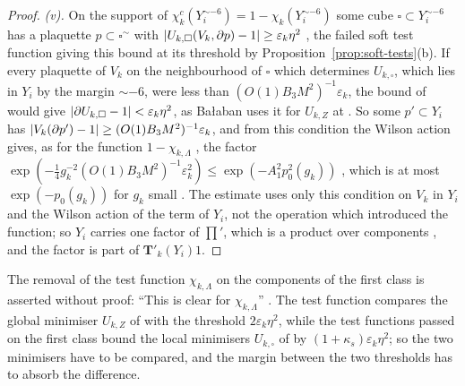\documentclass[11pt]{preprint}
\DeclarePairedDelimiter{\abs}{\lvert}{\rvert}
\numberwithin{equation}{section}
\theoremstyle{definition}
\theoremstyle{remark}
\theoremstyle{plain}
\begin{document}
\begin{proof}
\emph{(v).} On the support of $\chi^c_k(Y_i^{\sim-6}) = 1 - \chi_k(Y_i^{\sim-6})$ \cite[p.~378, l.~6, l.~21]{BalabanLFR2} some cube $\square \subset Y_i^{\sim-6}$ has a plaquette $p \subset \square^\sim$ with $\abs{U_{k,\square}(V_k, \partial p) - 1} \geq \varepsilon_k\eta^2$ \cite[(2.17), p.~257]{BalabanCRE}, the failed soft test function giving this bound at its threshold by Proposition~\ref{prop:soft-tests}(b). If every plaquette of $V_k$ on the neighbourhood of $\square$ which determines $U_{k,\square}$, which lies in $Y_i$ by the margin $\sim-6$, were less than $(O(1)B_3M^2)^{-1}\varepsilon_k$, the bound of \cite[Theorem~1, p.~279]{BalabanVAR} would give $\abs{\partial U_{k,\square} - 1} < \varepsilon_k\eta^2$, as Ba{\l}aban uses it for $U_{k,Z}$ at \cite[p.~193, l.~20, ll.~28--29]{BalabanLFR1}. So some $p' \subset Y_i$ has $\abs{V_k(\partial p') - 1} \geq (O(1)B_3M^2)^{-1}\varepsilon_k$, and from this condition the Wilson action gives, as for the function $1 - \chi_{k,\Lambda}$ \cite[p.~193, ll.~30--31]{BalabanLFR1}, the factor $\exp(-\frac14g_k^{-2}(O(1)B_3M^2)^{-1}\varepsilon_k^2) \leq \exp(-A_1^2p_0^2(g_k))$ \cite[p.~381, ll.~29--31]{BalabanLFR2}, which is at most $\exp(-p_0(g_k))$ for $g_k$ small \cite[p.~383, ll.~27--28]{BalabanLFR2}. The estimate uses only this condition on $V_k$ in $Y_i$ and the Wilson action of the term of $Y_i$, not the operation which introduced the function; so $Y_i$ carries one factor of $\prod'$, which is a product over components \cite[p.~383, ll.~40, 44]{BalabanLFR2}, and the factor is part of $\mathbf T'_k(Y_i)1$.
\end{proof}

The removal of the test function $\chi_{k,\Lambda}$ on the components of the first class is asserted without proof: ``This is clear for $\chi_{k,\Lambda}$'' \cite[p.~378, l.~10]{BalabanLFR2}. The test function compares the global minimiser $U_{k,Z}$ of \cite[(1.74)]{BalabanLFR1} with the threshold $2\varepsilon_k\eta^2$, while the test functions passed on the first class bound the local minimisers $U_{k,\square}$ of \cite[(2.16)]{BalabanCRE} by $(1 + \kappa_s)\varepsilon_k\eta^2$; so the two minimisers have to be compared, and the margin between the two thresholds has to absorb the difference.
\end{document}
